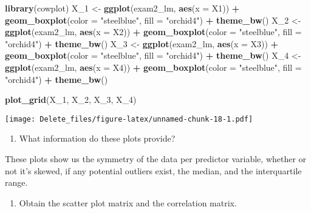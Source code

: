 \documentclass[
]{article}
\newenvironment{Shaded}{\begin{snugshade}}{\end{snugshade}}
\newcommand{\AttributeTok}[1]{\textcolor[rgb]{0.13,0.29,0.53}{#1}}
\newcommand{\FunctionTok}[1]{\textcolor[rgb]{0.13,0.29,0.53}{\textbf{#1}}}
\newcommand{\NormalTok}[1]{#1}
\newcommand{\OtherTok}[1]{\textcolor[rgb]{0.56,0.35,0.01}{#1}}
\newcommand{\SpecialCharTok}[1]{\textcolor[rgb]{0.81,0.36,0.00}{\textbf{#1}}}
\newcommand{\StringTok}[1]{\textcolor[rgb]{0.31,0.60,0.02}{#1}}
\providecommand{\tightlist}{%
  \setlength{\itemsep}{0pt}\setlength{\parskip}{0pt}}
\begin{document}
\begin{Shaded}
\begin{Highlighting}[]
\FunctionTok{library}\NormalTok{(cowplot)}
\NormalTok{X\_1 }\OtherTok{\textless{}{-}} \FunctionTok{ggplot}\NormalTok{(exam2\_lm, }\FunctionTok{aes}\NormalTok{(}\AttributeTok{x =}\NormalTok{ X1)) }\SpecialCharTok{+} \FunctionTok{geom\_boxplot}\NormalTok{(}\AttributeTok{color =} \StringTok{"steelblue"}\NormalTok{, }\AttributeTok{fill =} \StringTok{"orchid4"}\NormalTok{) }\SpecialCharTok{+} \FunctionTok{theme\_bw}\NormalTok{()}
\NormalTok{X\_2 }\OtherTok{\textless{}{-}} \FunctionTok{ggplot}\NormalTok{(exam2\_lm, }\FunctionTok{aes}\NormalTok{(}\AttributeTok{x =}\NormalTok{ X2)) }\SpecialCharTok{+} \FunctionTok{geom\_boxplot}\NormalTok{(}\AttributeTok{color =} \StringTok{"steelblue"}\NormalTok{, }\AttributeTok{fill =} \StringTok{"orchid4"}\NormalTok{) }\SpecialCharTok{+} \FunctionTok{theme\_bw}\NormalTok{()}
\NormalTok{X\_3 }\OtherTok{\textless{}{-}} \FunctionTok{ggplot}\NormalTok{(exam2\_lm, }\FunctionTok{aes}\NormalTok{(}\AttributeTok{x =}\NormalTok{ X3)) }\SpecialCharTok{+} \FunctionTok{geom\_boxplot}\NormalTok{(}\AttributeTok{color =} \StringTok{"steelblue"}\NormalTok{, }\AttributeTok{fill =} \StringTok{"orchid4"}\NormalTok{) }\SpecialCharTok{+} \FunctionTok{theme\_bw}\NormalTok{()}
\NormalTok{X\_4 }\OtherTok{\textless{}{-}} \FunctionTok{ggplot}\NormalTok{(exam2\_lm, }\FunctionTok{aes}\NormalTok{(}\AttributeTok{x =}\NormalTok{ X4)) }\SpecialCharTok{+} \FunctionTok{geom\_boxplot}\NormalTok{(}\AttributeTok{color =} \StringTok{"steelblue"}\NormalTok{, }\AttributeTok{fill =} \StringTok{"orchid4"}\NormalTok{) }\SpecialCharTok{+} \FunctionTok{theme\_bw}\NormalTok{()}

\FunctionTok{plot\_grid}\NormalTok{(X\_1, X\_2, X\_3, X\_4)}
\end{Highlighting}
\end{Shaded}

\texttt{[image: Delete\_files/figure-latex/unnamed-chunk-18-1.pdf]}

\begin{enumerate}
\def\labelenumi{(\alph{enumi})}
\setcounter{enumi}{1}
\tightlist
\item
  What information do these plots provide?
\end{enumerate}

These plots show us the symmetry of the data per predictor variable,
whether or not it's skewed, if any potential outliers exist, the median,
and the interquartile range.

\begin{enumerate}
\def\labelenumi{(\alph{enumi})}
\setcounter{enumi}{2}
\tightlist
\item
  Obtain the scatter plot matrix and the correlation matrix.
\end{enumerate}
\end{document}
